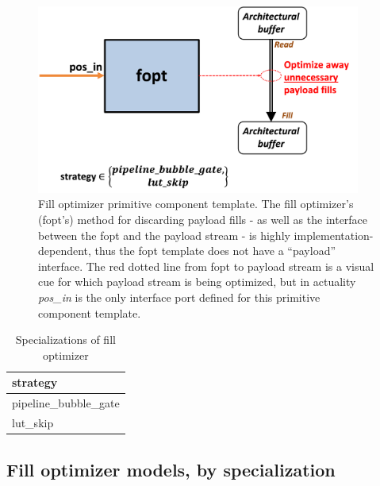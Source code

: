 \begin{figure}[H]
    \centering
    \includegraphics[width=0.95\textwidth]{figures/fopt.png}
    \caption{Fill optimizer primitive component template. The fill optimizer's (fopt's) method for discarding payload fills - as well as the interface between the fopt and the payload stream - is highly implementation-dependent, thus the fopt template does not have a ``payload'' interface. The red dotted line from fopt to payload stream is a visual cue for which payload stream is being optimized, but in actuality \textit{pos\_in} is the only interface port defined for this primitive component template.}
    \label{fig:fopt}
\end{figure}

\begin{table}[H]
\centering
\begin{tabular}{l}
\toprule
 strategy             \\
\midrule
 pipeline\_bubble\_gate \\
 lut\_skip             \\
\bottomrule
\end{tabular}
\caption{Specializations of fill optimizer}
\label{tab:FillOptimizer_specializations}
\end{table}

\subsection{Fill optimizer models, by specialization}